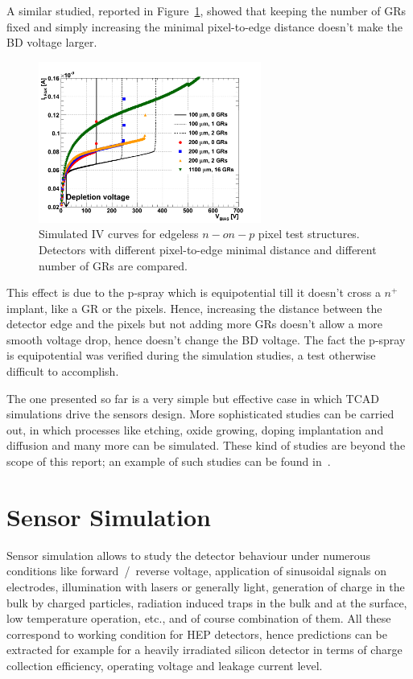 A similar studied, reported in Figure~\ref{fig:width_GRs}, showed that keeping the number of GRs fixed and simply increasing the 
minimal pixel-to-edge distance doesn't make the BD voltage larger.

\begin{figure}[!htbp]
\centering
\includegraphics[width=0.65\textwidth]{edgeless_BD_FL0_BandW_mix}
\caption{\label{fig:width_GRs}Simulated IV curves for edgeless $n-on-p$ pixel test structures. Detectors with different pixel-to-edge minimal distance 
and different number of GRs are compared.}
\end{figure}

This effect is due to the p-spray which is equipotential till it doesn't cross a $n^+$ implant, like a 
GR or the pixels. Hence, increasing the distance between the detector edge and the pixels but 
not adding more GRs doesn't allow a more smooth voltage drop, hence doesn't change the 
BD voltage. The fact the p-spray is equipotential was verified during the simulation studies, a test 
otherwise difficult to accomplish.


The one presented so far is a very simple but effective case in which TCAD simulations drive the 
sensors design. More sophisticated studies can be carried out, in which processes like 
etching, oxide growing, doping implantation and diffusion and many more can be simulated. 
These kind of studies are beyond the scope of this report; an example of such studies 
can be found in~\cite{CISSIMDET2014}. 

\section{Sensor Simulation}
\label{sec:sensorsimulation}

Sensor simulation allows to study the detector behaviour under numerous conditions like 
forward~/~reverse voltage, application of sinusoidal signals on electrodes, illumination with lasers or 
generally light, generation of charge in the 
bulk by charged particles, radiation induced traps in the bulk and at the surface, low temperature 
operation, etc., 
and of course combination of them.
All these correspond to working condition for HEP detectors, hence predictions can be extracted 
for example for a heavily irradiated silicon detector in terms of charge collection efficiency, operating 
voltage and leakage current level.

